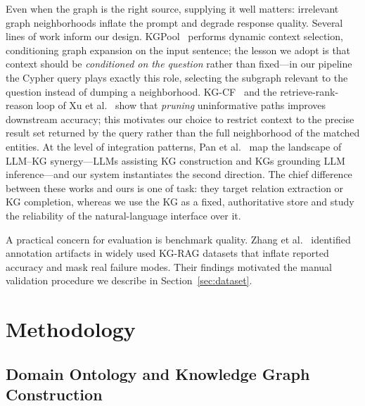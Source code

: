 \documentclass{ceurart}
\begin{document}
Even when the graph is the right source, supplying it well matters: irrelevant
graph neighborhoods inflate the prompt and degrade response quality. Several lines
of work inform our design. KGPool~\cite{nadgeri-etal-2021-kgpool} performs dynamic
context selection, conditioning graph expansion on the input sentence; the lesson
we adopt is that context should be \emph{conditioned on the question} rather than
fixed---in our pipeline the Cypher query plays exactly this role, selecting the
subgraph relevant to the question instead of dumping a neighborhood. KG-CF~\cite{KG-CF}
and the retrieve-rank-reason loop of Xu et al.~\cite{xu2024contextgraph} show that
\emph{pruning} uninformative paths improves downstream accuracy; this motivates our
choice to restrict context to the precise result set returned by the query rather
than the full neighborhood of the matched entities. At the level of integration
patterns, Pan et al.~\cite{UnifyingLLMandKG} map the landscape of LLM--KG
synergy---LLMs assisting KG construction and KGs grounding LLM inference---and our
system instantiates the second direction. The chief difference between these works
and ours is one of task: they target relation extraction or KG completion, whereas
we use the KG as a fixed, authoritative store and study the reliability of the
natural-language interface over it.

A practical concern for evaluation is benchmark quality. Zhang et
al.~\cite{zhang2025diagnosingaddressingpitfallskgrag} identified annotation
artifacts in widely used KG-RAG datasets that inflate reported accuracy and mask
real failure modes. Their findings motivated the manual validation procedure we
describe in Section~\ref{sec:dataset}.

\section{Methodology}

\subsection{Domain Ontology and Knowledge Graph Construction}
\label{sec:ontology}
\end{document}
